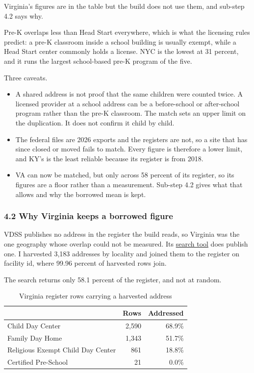 \documentclass[11pt]{article}
\begin{document}
Virginia's figures are in the table but the build does not use them, and
sub-step 4.2 says why.

Pre-K overlaps less than Head Start everywhere, which is what the licensing rules
predict: a pre-K classroom inside a school building is usually exempt, while a
Head Start center commonly holds a license. NYC is the lowest at 31 percent, and
it runs the largest school-based pre-K program of the five.

Three caveats.

\begin{itemize}
\setlength{\itemsep}{0.45em}
\item A shared address is not proof that the same children were counted twice. A
      licensed provider at a school address can be a before-school or
      after-school program rather than the pre-K classroom. The match sets an
      upper limit on the duplication. It does not confirm it child by child.
\item The federal files are 2026 exports and the registers are not, so a site
      that has since closed or moved fails to match. Every figure is therefore a lower
      limit, and KY's is the least reliable because its register is from 2018.
\item VA can now be matched, but only across 58 percent of its register, so its
      figures are a floor rather than a measurement. Sub-step 4.2 gives what
      that allows and why the borrowed mean is kept.
\end{itemize}

\subsubsection*{4.2 Why Virginia keeps a borrowed figure}

VDSS publishes no address in the register the build reads, so Virginia was the
one geography whose overlap could not be measured. Its
\href{https://legacy.dss.virginia.gov/facility/search/cc2.cgi}{search tool} does
publish one. I harvested 3,183 addresses by locality and joined them to the
register on facility id, where 99.96 percent of harvested rows join.

The search returns only 58.1 percent of the register, and not at random.

\begin{table}[H]
\centering
\caption{Virginia register rows carrying a harvested address}
\begin{tabular}{L{7.0cm}rr}
\toprule
& \textbf{Rows} & \textbf{Addressed} \\
\midrule
Child Day Center                  & 2,590 & 68.9\% \\
Family Day Home                   & 1,343 & 51.7\% \\
Religious Exempt Child Day Center &   861 & 18.8\% \\
Certified Pre-School              &    21 &  0.0\% \\
\bottomrule
\end{tabular}
\end{table}
\end{document}
